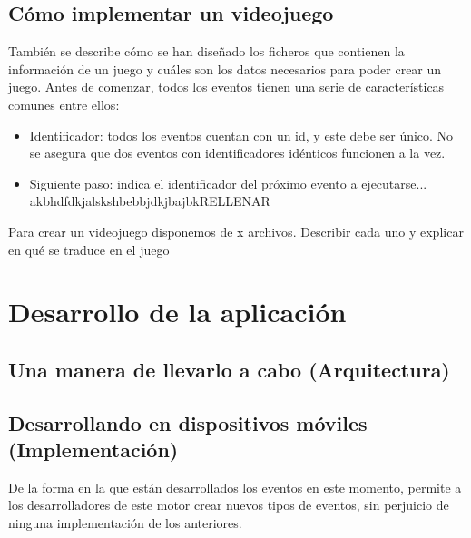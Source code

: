 \section{Cómo implementar un videojuego}

También se describe cómo se han diseñado los ficheros que contienen la información de un juego y cuáles son los datos necesarios para poder crear un juego.
Antes de comenzar, todos los eventos tienen una serie de características comunes entre ellos:

\begin{itemize}
	\item Identificador: todos los eventos cuentan con un id, y este debe ser único. No se asegura que dos eventos con identificadores idénticos funcionen a la vez.
	\item Siguiente paso: indica el identificador del próximo evento a ejecutarse...
	akbhdfdkjalskshbebbjdkjbajbkRELLENAR
\end{itemize}

Para crear un videojuego disponemos de x archivos.
Describir cada uno y explicar en qué se traduce en el juego



\chapter{Desarrollo de la aplicación} \label{applicationImplementation}

\section{Una manera de llevarlo a cabo (Arquitectura)}

\section{Desarrollando en dispositivos móviles (Implementación)}

De la forma en la que están desarrollados los eventos en este momento, permite a los desarrolladores de este motor crear nuevos tipos de eventos, sin perjuicio de ninguna implementación de los anteriores.
